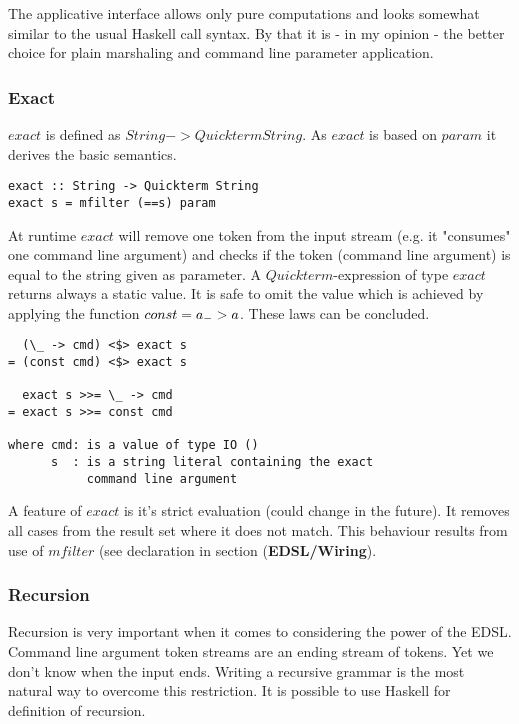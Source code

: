 \documentclass[a4paper]{article}
\begin{document}
The applicative interface allows only pure computations and looks somewhat similar to the usual Haskell call syntax. By that it is - in my opinion - the better choice for plain marshaling and command line parameter application.

\subsubsection{Exact}
$exact$ is defined as $String -> Quickterm String$. As $exact$ is based on $param$ it derives the basic semantics.

\begin{lstlisting}
exact :: String -> Quickterm String
exact s = mfilter (==s) param
\end{lstlisting}

At runtime $exact$ will remove one token from the input stream (e.g. it "consumes" one command line argument) and checks if the token (command line argument) is equal to the string given as parameter.
A $Quickterm$-expression of type $exact$ returns always a static value. It is safe to omit the value which is achieved by applying the function $const = \\a _ -> a$. These laws can be concluded.

\begin{lstlisting}
  (\_ -> cmd) <$> exact s
= (const cmd) <$> exact s

  exact s >>= \_ -> cmd
= exact s >>= const cmd

where cmd: is a value of type IO ()
      s  : is a string literal containing the exact
           command line argument
\end{lstlisting}

A feature of $exact$ is it's strict evaluation (could change in the future). It removes all cases from the result set where it does not match. This behaviour results from use of $mfilter$ (see declaration in section (\textbf{EDSL/Wiring}).

\subsubsection{Recursion}
Recursion is very important when it comes to considering the power of the EDSL. Command line argument token streams are an ending stream of tokens. Yet we don't know when the input ends. Writing a recursive grammar is the most natural way to overcome this restriction. It is possible to use Haskell for definition of recursion.
\end{document}
